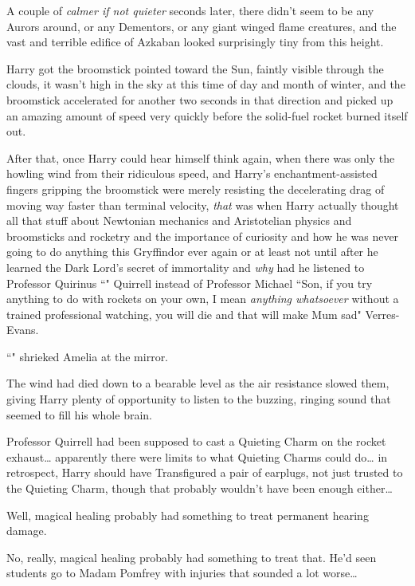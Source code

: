 A couple of \emph{calmer if not quieter} seconds later, there didn't seem to be any Aurors around, or any Dementors, or any giant winged flame creatures, and the vast and terrible edifice of Azkaban looked surprisingly tiny from this height.

Harry got the broomstick pointed toward the Sun, faintly visible through the clouds, it wasn't high in the sky at this time of day and month of winter, and the broomstick accelerated for another two seconds in that direction and picked up an amazing amount of speed very quickly before the solid-fuel rocket burned itself out.

After that, once Harry could hear himself think again, when there was only the howling wind from their ridiculous speed, and Harry's enchantment-assisted fingers gripping the broomstick were merely resisting the decelerating drag of moving way faster than terminal velocity, \emph{that} was when Harry actually thought all that stuff about Newtonian mechanics and Aristotelian physics and broomsticks and rocketry and the importance of curiosity and how he was never going to do anything this Gryffindor ever again or at least not until after he learned the Dark Lord's secret of immortality and \emph{why} had he listened to Professor Quirinus ``" Quirrell instead of Professor Michael ``Son, if you try anything to do with rockets on your own, I mean \emph{anything whatsoever} without a trained professional watching, you will die and that will make Mum sad" Verres-Evans.

\later

``" shrieked Amelia at the mirror.

\later

The wind had died down to a bearable level as the air resistance slowed them, giving Harry plenty of opportunity to listen to the buzzing, ringing sound that seemed to fill his whole brain.

Professor Quirrell had been supposed to cast a Quieting Charm on the rocket exhaust{\ldots} apparently there were limits to what Quieting Charms could do{\ldots} in retrospect, Harry should have Transfigured a pair of earplugs, not just trusted to the Quieting Charm, though that probably wouldn't have been enough either{\ldots}

Well, magical healing probably had something to treat permanent hearing damage.

No, really, magical healing probably had something to treat that. He'd seen students go to Madam Pomfrey with injuries that sounded a lot worse{\ldots}


